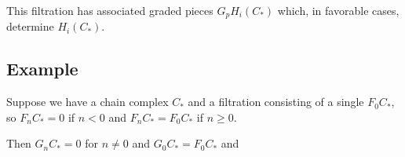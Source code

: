 \documentclass[reqno]{amsart}
\theoremstyle{definition}
\theoremstyle{remark}
\begin{document}
This filtration has associated graded pieces
$G_p H_i (C_*)$ which, in favorable cases, determine
$H_i (C_*)$.\\
\linebreak



\subsection{Example}

Suppose we have a chain complex
$C_*$ and a filtration consisting
of a single $F_0 C_*$, so
$F_n C_* = 0$ if
$n <0$ and
$F_n C_* = F_0 C_*$ if $n\ge 0$.

Then
$G_n C_* = 0$ for
$n \neq  0$ and
$G_0 C_* = F_0 C_*$ and



























\end{document}
